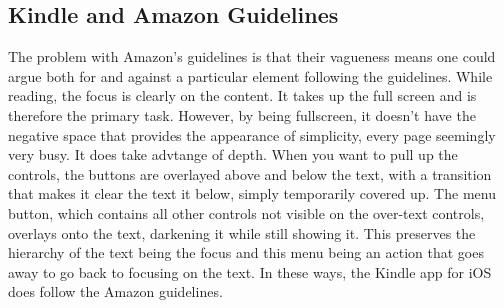 \documentclass[journal,letterpaper]{article}
\begin{document}
    \subsection{Kindle and Amazon Guidelines}
    The problem with Amazon's guidelines is that their vagueness means one could argue both for and against a particular element following the guidelines. While reading, the focus is clearly on the content. It takes up the full screen and is therefore the primary task. However, by being fullscreen, it doesn't have the negative space that provides the appearance of simplicity, every page seemingly very busy. It does take advtange of depth. When you want to pull up the controls, the buttons are overlayed above and below the text, with a transition that makes it clear the text it below, simply temporarily covered up. The menu button, which contains all other controls not visible on the over-text controls, overlays onto the text, darkening it while still showing it. This preserves the hierarchy of the text being the focus and this menu being an action that goes away to go back to focusing on the text. In these ways, the Kindle app for iOS does follow the Amazon guidelines.

    
\end{document}
